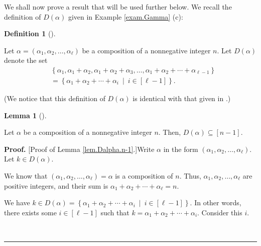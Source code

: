 \documentclass[numbers=enddot,12pt,final,onecolumn,notitlepage,abstracton]{scrartcl}
\theoremstyle{definition}
\newtheorem{lem}[theo]{Lemma}
\newenvironment{lemma}[1][]
{\begin{lem}[#1]\begin{leftbar}}
{\end{leftbar}\end{lem}}
\newtheorem{defi}[theo]{Definition}
\newenvironment{definition}[1][]
{\begin{defi}[#1]\begin{leftbar}}
{\end{leftbar}\end{defi}}
\newenvironment{proof}[1][Proof]{\noindent\textbf{#1.} }{\ \rule{0.5em}{0.5em}}
\newenvironment{verlong}{}{}
\begin{document}
\begin{verlong}
\begin{footnotesize}
We shall now prove a result that will be used further below. We recall the
definition of $D\left(  \alpha\right)  $ given in Example \ref{exam.Gamma} (c):

\begin{definition}
\label{def.Dalpha}Let $\alpha=\left(  \alpha_{1},\alpha_{2},\ldots
,\alpha_{\ell}\right)  $ be a composition of a nonnegative integer $n$. Let
$D\left(  \alpha\right)  $ denote the set
\begin{align*}
&  \left\{  \alpha_{1},\alpha_{1}+\alpha_{2},\alpha_{1}+\alpha_{2}+\alpha
_{3},\ldots,\alpha_{1}+\alpha_{2}+\cdots+\alpha_{\ell-1}\right\} \\
&  =\left\{  \alpha_{1}+\alpha_{2}+\cdots+\alpha_{i}\ \mid\ i\in\left[
\ell-1\right]  \right\}  .
\end{align*}

\end{definition}

(We notice that this definition of $D\left(  \alpha\right)  $ is identical
with that given in \cite[Definition 5.1.10]{Reiner}.)

\begin{lemma}
\label{lem.Dalpha.n-1}Let $\alpha$ be a composition of a nonnegative integer
$n$. Then, $D\left(  \alpha\right)  \subseteq\left[  n-1\right]  $.
\end{lemma}

\begin{proof}
[Proof of Lemma \ref{lem.Dalpha.n-1}.]Write $\alpha$ in the form $\left(
\alpha_{1},\alpha_{2},\ldots,\alpha_{\ell}\right)  $. Let $k\in D\left(
\alpha\right)  $.

We know that $\left(  \alpha_{1},\alpha_{2},\ldots,\alpha_{\ell}\right)
=\alpha$ is a composition of $n$. Thus, $\alpha_{1},\alpha_{2},\ldots
,\alpha_{\ell}$ are positive integers, and their sum is $\alpha_{1}+\alpha
_{2}+\cdots+\alpha_{\ell}=n$.

We have $k\in D\left(  \alpha\right)  =\left\{  \alpha_{1}+\alpha_{2}%
+\cdots+\alpha_{i}\ \mid\ i\in\left[  \ell-1\right]  \right\}  $. In other
words, there exists some $i\in\left[  \ell-1\right]  $ such that $k=\alpha
_{1}+\alpha_{2}+\cdots+\alpha_{i}$. Consider this $i$.


\end{proof}
\end{footnotesize}
\end{verlong}
\end{document}
